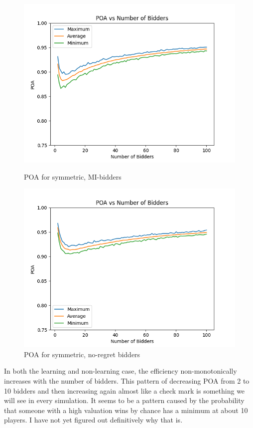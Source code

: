 \documentclass[12pt,twoside]{reedthesis}
\begin{document}
\begin{figure}
	\centering
	\begin{minipage}{0.49\textwidth}
		\centering
		\includegraphics[scale=0.5]{Figures/zi_symmetric}
		\caption{POA for symmetric, MI-bidders}
		\label{figure:mi_symmetric}
	\end{minipage}
	\begin{minipage}{0.49\textwidth}
		\centering
		\includegraphics[scale=0.5]{Figures/symmetric}
		\caption{POA for symmetric, no-regret bidders}
		\label{figure:symmetric}
	\end{minipage}
\end{figure}
In both the learning and non-learning case, the efficiency non-monotonically increases with the number of bidders. This pattern of decreasing POA from 2 to 10 bidders and then increasing again almost like a check mark is something we will see in every simulation. It seems to be a pattern caused by the probability that someone with a high valuation wins by chance has a minimum at about 10 players. I have not yet figured out definitively why that is.
\end{document}
